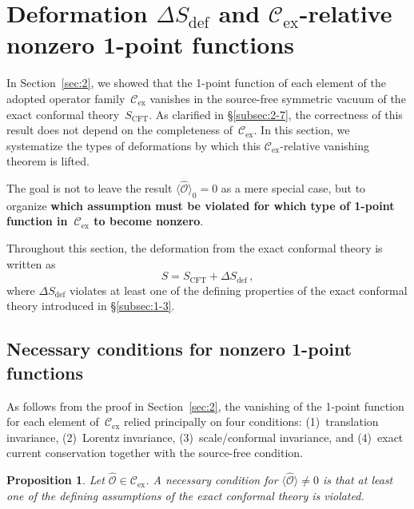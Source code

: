 \documentclass[
  aps,
  prd,
  preprint,
  groupedaddress,
  nofootinbib,
  longbibliography
]{revtex4-2}
\newtheorem{proposition}[definition]{Proposition}
\theoremstyle{remark}
\newcommand{\Cex}{\mathcal{C}_{\mathrm{ex}}}
\begin{document}
\section{Deformation \texorpdfstring{$\Delta S_{\mathrm{def}}$}{Delta S def}
  and \texorpdfstring{$\Cex$}{Cex}-relative nonzero 1-point functions}\label{sec:3}

In Section~\ref{sec:2}, we showed that the 1-point function of
each element of the adopted operator family~$\Cex$ vanishes in
the source-free symmetric vacuum of the exact conformal
theory~$S_{\mathrm{CFT}}$.
As clarified in \S\ref{subsec:2-7}, the correctness of this result
does not depend on the completeness of~$\Cex$.
In this section, we systematize the types of deformations by which
this $\Cex$-relative vanishing theorem is lifted.

The goal is not to leave the result
$\langle\hat{\mathcal{O}}\rangle_0=0$ as a mere special case, but
to organize \textbf{which assumption must be violated for which
type of 1-point function in~$\Cex$ to become nonzero}.

Throughout this section, the deformation from the exact conformal
theory is written as
\begin{equation}\label{eq:deformation-sec3}
  S = S_{\mathrm{CFT}} + \Delta S_{\mathrm{def}}\,,
\end{equation}
where $\Delta S_{\mathrm{def}}$ violates at least one of the
defining properties of the exact conformal theory introduced
in \S\ref{subsec:1-3}.

\subsection{Necessary conditions for nonzero 1-point functions}%
  \label{subsec:3-1}

As follows from the proof in Section~\ref{sec:2},
the vanishing of the 1-point function for each element of~$\Cex$
relied principally on four conditions: (1)~translation invariance,
(2)~Lorentz invariance, (3)~scale/conformal invariance, and
(4)~exact current conservation together with the source-free
condition.

\begin{proposition}\label{prop:necessary}
Let $\hat{\mathcal{O}}\in\Cex$.
A necessary condition for
$\langle\hat{\mathcal{O}}\rangle\neq 0$ is that at least one
of the defining assumptions of the exact conformal theory is
violated.
\end{proposition}
\end{document}
